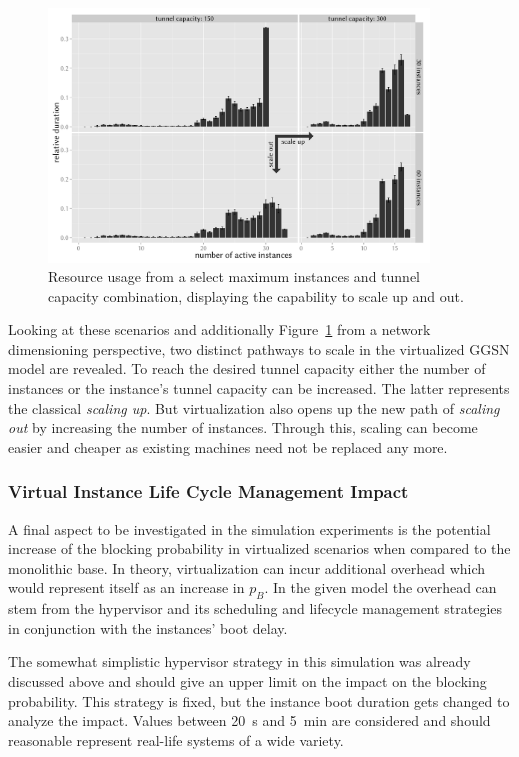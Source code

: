 \begin{figure}[htbp]
	\centering
	\includegraphics[width=0.9\textwidth]{images/R-virtualized-instanceuse-barplot.pdf}
	\caption{Resource usage from a select maximum instances and tunnel capacity combination, displaying the capability to scale up and out.}
\label{c4:fig:res-usage-barplot}
\end{figure}


Looking at these scenarios and additionally Figure~\ref{c4:fig:res-usage-barplot} from a network dimensioning perspective, two distinct pathways to scale in the virtualized \gls{GGSN} model are revealed. To reach the desired tunnel capacity either the number of instances or the instance's tunnel capacity can be increased. The latter represents the classical \textit{scaling up}. But virtualization also opens up the new path of \textit{scaling out} by increasing the number of instances. Through this, scaling can become easier and cheaper as existing machines need not be replaced any more.


\subsubsection{Virtual Instance Life Cycle Management Impact}

A final aspect to be investigated in the simulation experiments is the potential increase of the blocking probability in virtualized scenarios when compared to the monolithic base. In theory, virtualization can incur additional overhead which would represent itself as an increase in $p_B$. In the given model the overhead can stem from the hypervisor and its scheduling  and lifecycle management strategies in conjunction with the instances' boot delay. 

The somewhat simplistic hypervisor strategy in this simulation was already discussed above and should give an upper limit on the impact on the blocking probability. This strategy is fixed, but the instance boot duration gets changed to analyze the impact. Values between \SI{20}{\second} and \SI{5}{\minute} are considered and should reasonable represent real-life systems of a wide variety.

